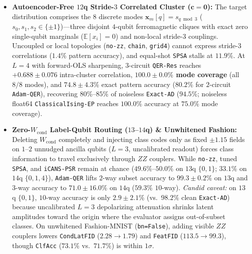 \documentclass[11pt]{article}
\begin{document}
\begin{itemize}[leftmargin=1.4em,itemsep=2pt,topsep=2pt]
  \item \textbf{Autoencoder-Free $12$q Stride-$3$ Correlated Cluster ($\mathbf{c}{=}\mathbf{0}$):} The target distribution comprises the $8$ discrete modes $\mathbf{x}_m[q] = s_{q\bmod 3}$ ($s_0,s_1,s_2\in\{\pm 1\}$)—three disjoint $4$-qubit ferromagnetic cliques with exact zero single-qubit marginals ($\mathbb{E}[x_i]{=}0$) and non-local stride-$3$ couplings. Uncoupled or local topologies (\texttt{no-zz}, \texttt{chain}, \texttt{grid4}) cannot express stride-$3$ correlations ($1.4\%$ pattern accuracy), and equal-shot \texttt{SPSA} stalls at $11.9\%$. At $L{=}4$ with forward-OLS sharpening, $3$-circuit \texttt{QER-Res} reaches $+0.688\pm 0.076$ intra-cluster correlation, \textbf{$100.0\pm 0.0\%$ mode coverage} (all $8/8$ modes), and $74.8\pm 4.3\%$ exact pattern accuracy ($80.2\%$ for $2$-circuit \texttt{Adam-QER}), recovering $80\%$--$85\%$ of noiseless \texttt{Exact-AD} ($94.5\%$; noiseless float64 \texttt{ClassicalIsing-EP} reaches $100.0\%$ accuracy at $75.0\%$ mode coverage).
  \item \textbf{Zero-$W_{\text{cond}}$ Label-Qubit Routing ($13$--$14$q) \& Unwhitened Fashion:} Deleting $W_{\text{cond}}$ completely and injecting class codes only as fixed $\pm 1.15$ fields on $1$--$2$ unnudged ancilla qubits ($L{=}3$, uncalibrated readout) forces class information to travel exclusively through $ZZ$ couplers. While \texttt{no-zz}, tuned \texttt{SPSA}, and \texttt{iCANS-PSR} remain at chance ($49.6\%$--$50.0\%$ on $13$q $\{0,1\}$; $33.1\%$ on $14$q $\{0,1,4\}$), \texttt{Adam-QER} lifts $2$-way subset accuracy to $99.3\pm 0.2\%$ on $13$q and $3$-way accuracy to $71.0\pm 16.0\%$ on $14$q ($59.3\%$ $10$-way). \emph{Candid caveat:} on $13$q $\{0,1\}$, $10$-way accuracy is only $2.9\pm 2.1\%$ (vs.\ $98.2\%$ clean \texttt{Exact-AD}) because uncalibrated $L{=}3$ depolarizing attenuation shrinks latent amplitudes toward the origin where the evaluator assigns out-of-subset classes. On unwhitened Fashion-MNIST (\texttt{bn=False}), adding visible $ZZ$ couplers lowers \texttt{CondLatFID} ($2.28{\to}1.79$) and \texttt{FeatFID} ($113.5{\to}99.3$), though \texttt{ClfAcc} ($73.1\%$ vs.\ $71.7\%$) is within $1\sigma$.
\end{itemize}
\end{document}
